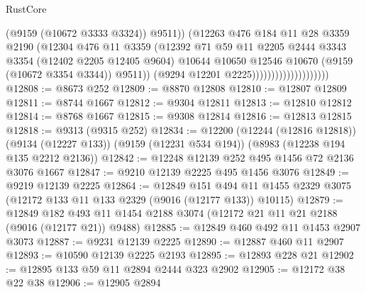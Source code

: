 \begin{lexlean}{RustCore}
\begin{coremodule}
                                            (@9159 (@10672 @3333 @3324))
                                            @9511))
                                        (@12263
                                          @476
                                          @184
                                          @11
                                          @28
                                          @3359
                                          @2190
                                          (@12304
                                            @476
                                            @11
                                            @3359
                                            (@12392
                                              @71
                                              @59
                                              @11
                                              @2205
                                              @2444
                                              @3343
                                              @3354
                                              (@12402 @2205 @12405 @9604)
                                              @10644
                                              @10650
                                              @12546
                                              @10670
                                              (@9159 (@10672 @3354 @3344))
                                              @9511))
                                          (@9294 @12201 @2225))))))))))))))))))))
@12808 := @8673 @252
@12809 := @8870 @12808
@12810 := @12807 @12809
@12811 := @8744 @1667
@12812 := @9304 @12811
@12813 := @12810 @12812
@12814 := @8768 @1667
@12815 := @9308 @12814
@12816 := @12813 @12815
@12818 := @9313 (@9315 @252)
@12834 := @12200
    (@12244 (@12816 @12818))
    (@9134 (@12227 @133))
    (@9159 (@12231 @534 @194))
    (@8983 (@12238 @194 @135 @2212 @2136))
@12842 := @12248 @12139 @252 @495 @1456 @72 @2136 @3076 @1667
@12847 := @9210 @12139 @2225 @495 @1456 @3076
@12849 := @9219 @12139 @2225
@12864 := @12849
    @151
    @494
    @11
    @1455
    @2329
    @3075
    (@12172 @133 @11 @133 @2329 (@9016 (@12177 @133)) @10115)
@12879 := @12849
    @182
    @493
    @11
    @1454
    @2188
    @3074
    (@12172 @21 @11 @21 @2188 (@9016 (@12177 @21)) @9488)
@12885 := @12849 @460 @492 @11 @1453 @2907 @3073
@12887 := @9231 @12139 @2225
@12890 := @12887 @460 @11 @2907
@12893 := @10590 @12139 @2225 @2193
@12895 := @12893 @228 @21
@12902 := @12895 @133 @59 @11 @2894 @2444 @323 @2902
@12905 := @12172 @38 @22 @38
@12906 := @12905 @2894

\end{coremodule}
\end{lexlean}
